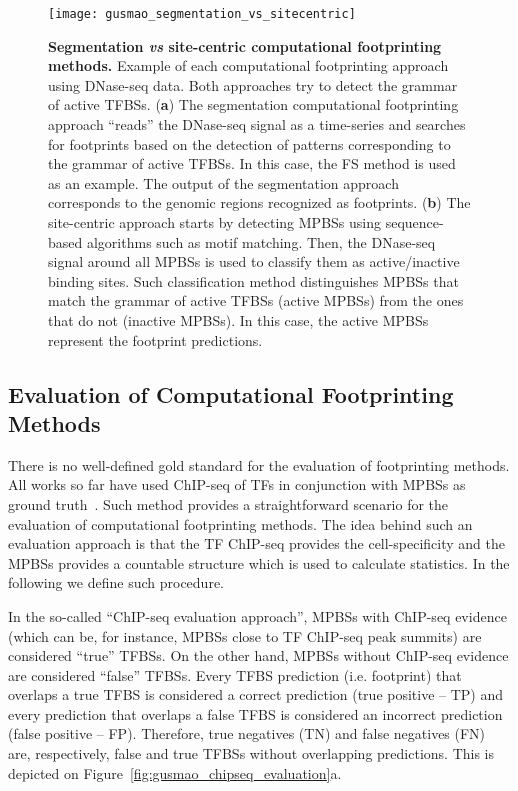 \begin{figure}[h!]
\centering
\texttt{[image: gusmao\_segmentation\_vs\_sitecentric]}
\caption[Segmentation \emph{vs} site-centric computational footprinting methods]{\textbf{Segmentation \emph{vs} site-centric computational footprinting methods.} Example of each computational footprinting approach using DNase-seq data. Both approaches try to detect the grammar of active TFBSs. (\textbf{a}) The segmentation computational footprinting approach ``reads'' the DNase-seq signal as a time-series and searches for footprints based on the detection of patterns corresponding to the grammar of active TFBSs. In this case, the FS method is used as an example. The output of the segmentation approach corresponds to the genomic regions recognized as footprints. (\textbf{b}) The site-centric approach starts by detecting MPBSs using sequence-based algorithms such as motif matching. Then, the DNase-seq signal around all MPBSs is used to classify them as active/inactive binding sites. Such classification method distinguishes MPBSs that match the grammar of active TFBSs (active MPBSs) from the ones that do not (inactive MPBSs). In this case, the active MPBSs represent the footprint predictions.}
\label{fig:gusmao_segmentation_vs_sitecentric}
\end{figure}

\subsection{Evaluation of Computational Footprinting Methods}
\label{sec:evaluation.computational.footprinting.methods}

There is no well-defined gold standard for the evaluation of footprinting methods. All works so far have used ChIP-seq of TFs in conjunction with MPBSs as ground truth~\citep{pique2011,cuellar2012}. Such method provides a straightforward scenario for the evaluation of computational footprinting methods. The idea behind such an evaluation approach is that the TF ChIP-seq provides the cell-specificity and the MPBSs provides a countable structure which is used to calculate statistics. In the following we define such procedure.

In the so-called ``ChIP-seq evaluation approach'', MPBSs with ChIP-seq evidence (which can be, for instance, MPBSs close to TF ChIP-seq peak summits) are considered ``true'' TFBSs. On the other hand, MPBSs without ChIP-seq evidence are considered ``false'' TFBSs. Every TFBS prediction (i.e. footprint) that overlaps a true TFBS is considered a correct prediction (true positive -- TP) and every prediction that overlaps a false TFBS is considered an incorrect prediction (false positive -- FP). Therefore, true negatives (TN) and false negatives (FN) are, respectively, false and true TFBSs without overlapping predictions. This is depicted on Figure~\ref{fig:gusmao_chipseq_evaluation}a.

